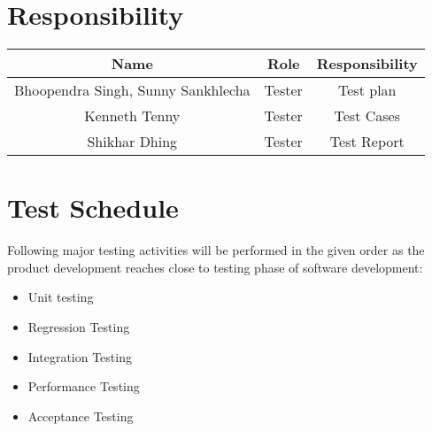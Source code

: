 \documentclass[12pt]{article}
\begin{document}
\section{Responsibility}
\begin{center}
\begin{tabular}{|c|c|c|}
\hline
\textbf{Name} & \textbf{Role} &\textbf{Responsibility}\\ \hline
Bhoopendra Singh, Sunny Sankhlecha & Tester & Test plan \\ \hline
Kenneth Tenny & Tester & Test Cases\\ \hline
Shikhar Dhing & Tester & Test Report \\ \hline
\end{tabular}
\end{center}

\section{Test Schedule}
Following major testing activities will be performed in the given order as the product development reaches close to testing phase of software development:
\begin{itemize}
    \item Unit testing
    \item Regression Testing
    \item Integration Testing
    \item Performance Testing
    \item Acceptance Testing
\end{itemize}
\end{document}

